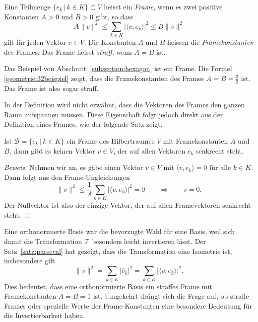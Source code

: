 \begin{definition}
\label{definition:frame}
Eine Teilmenge $\{ e_k\,|\, k\in K\}\subset V$ heisst ein {\em Frame},
wenn es zwei positive Konstanten $A>0$ und $B>0$ gibt, so dass
\[
A\|v\|^2 \le \sum_{k\in K} |\langle v, e_k\rangle|^2 \le B \| v\|^2
\]
gilt für jeden Vektor $v\in V$.
Die Konstanten $A$ und $B$ heissen die {\em Framekonstanten} des Frames.
Das Frame heisst {\em straff}, wenn $A=B$ ist.
\end{definition}

\begin{beispiel}
Das Beispiel von Abschnitt~\ref{subsection:hexagon} ist ein Frame.
Die Formel \eqref{geometrie:32beispiel} zeigt, dass die Framekonstanten
des Frames $A=B=\frac32$ ist.
Das Frame ist also sogar straff.
\end{beispiel}

In der Definition wird nicht erwähnt, dass die Vektoren des Frames den
ganzen Raum aufspannen müssen.
Diese Eigenschaft folgt jedoch direkt aus der Definition eines Frames,
wie der folgende Satz zeigt.

\begin{satz}
Ist $\mathcal{B}=\{ e_k\,|\, k\in K\}$ ein Frame des Hilbertraumes $V$
mit Framekonstanten $A$ und $B$, dann gibt es keinen Vektor $v\in V$,
der auf allen Vektoren $e_k$ senkrecht steht.
\end{satz}

\begin{proof}[Beweis]
Nehmen wir an, es gäbe einen Vektor $v\in V$ mit $\langle v,e_k\rangle=0$
für alle $k\in K$.
Dann folgt aus den Frame-Ungleichungen
\[
\| v \|^2 \le \frac1{A} \sum_{k\in K} |\langle v,e_k\rangle|^2 = 0
\qquad\Rightarrow\qquad
v=0.
\]
Der Nullvektor ist also der einzige Vektor, der auf allen Framevektoren
senkrecht steht.
\end{proof}

Eine orthonormierte Basis war die bevorzugte Wahl für eine Basis, weil
sich damit die Transformation $\mathcal{T}$ besonders leicht invertieren
lässt.
Der Satz~\ref{satz:parseval} hat gezeigt, dass die Transformation %
eine Isometrie ist, insbesondere gilt
\[
\|v\|^2
=
\sum_{k\in K} |\hat{v}_k|^2
=
\sum_{k\in K} |\langle v,e_k\rangle|^2.
\]
Dies bedeutet, dass eine orthonormierte Basis ein straffes Frame mit
Framekonstanten $A=B=1$ ist.
Umgekehrt drängt sich die Frage auf, ob straffe Frames oder spezielle
Werte der Frame-Konstanten eine besondere Bedeutung für die Invertierbarkeit
haben.

